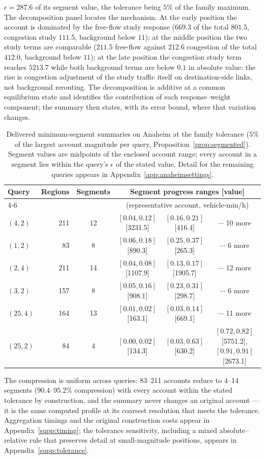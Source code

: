 $\epsilon=287.6$ of its segment value, the tolerance being $5\%$ of the
family maximum. The decomposition panel locates the mechanism. At the
early position the account is dominated by the free-flow study response
($669.3$ of the total $801.5$, congestion study $111.5$, background
below $11$); at the middle position the two study terms are comparable
($211.5$ free-flow against $212.6$ congestion of the total $412.0$,
background below $11$); at the late position the congestion study term
reaches $5213.7$ while both background terms are below $0.1$ in
absolute value: the rise is congestion adjustment of the study traffic
itself on destination-side links, not background rerouting. The
decomposition is additive at a common equilibrium state and identifies
the contribution of each response--weight component; the summary then
states, with its error bound, where that variation changes.
\begin{table}[t]\centering\footnotesize
\caption{Delivered minimum-segment summaries on Anaheim at the family
tolerance ($5\%$ of the largest account magnitude per query,
Proposition~\ref{prop:segmented}). Segment values are midpoints of the
enclosed account range; every account in a segment lies within the
query's $\epsilon$ of the stated value. Detail for the remaining
queries appears in Appendix~\ref{app:anaheimsettings}.}\label{tab:anaheimsegments}
\setlength{\tabcolsep}{4pt}
\begin{tabular*}{\tblwidth}{@{\extracolsep{\fill}}lrcccc}
\toprule
Query & Regions & Segments & \multicolumn{3}{c}{Segment progress ranges [value]}\\
\cmidrule(lr){4-6}
 & & & \multicolumn{3}{c}{(representative account, vehicle-min/h)}\\
\midrule
$(4,2)$ & 211 & 12 & $[0.04,0.12]$ [3231.5] & $[0.16,0.21]$ [416.4] & $\cdots$ 10 more\\
$(1,2)$ & 83 & 8 & $[0.06,0.18]$ [890.3] & $[0.25,0.37]$ [265.3] & $\cdots$ 6 more\\
$(2,4)$ & 211 & 14 & $[0.04,0.08]$ [1107.9] & $[0.13,0.17]$ [1905.7] & $\cdots$ 12 more\\
$(3,2)$ & 157 & 8 & $[0.05,0.16]$ [908.1] & $[0.23,0.31]$ [298.7] & $\cdots$ 6 more\\
$(25,4)$ & 164 & 13 & $[0.01,0.02]$ [163.1] & $[0.03,0.14]$ [669.1] & $\cdots$ 11 more\\
$(25,2)$ & 84 & 4 & $[0.00,0.02]$ [134.3] & $[0.03,0.63]$ [630.2] & $[0.72,0.82]$ [5751.2], $[0.91,0.91]$ [2673.1]\\
\bottomrule\end{tabular*}\end{table}
The compression is uniform across queries: 83--211 accounts reduce to
4--14 segments ($90.4$--$95.2\%$ compression) with every account within
the stated tolerance by construction, and the summary never changes an
original account --- it is the same computed profile at its coarsest
resolution that meets the tolerance. Aggregation timings and the original construction
costs appear in Appendix~\ref{supp:timing}; the tolerance sensitivity,
including a mixed absolute--relative rule that preserves detail at
small-magnitude positions, appears in Appendix~\ref{supp:tolerance}.
